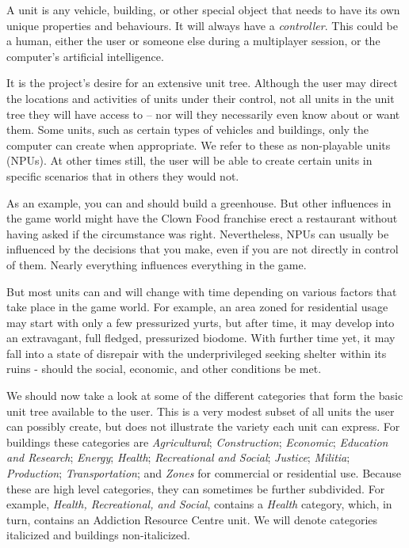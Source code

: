 

A unit is any vehicle, building, or other special object that needs to have its own unique properties and behaviours. It will always have a {\it controller}. This could be a human, either the user or someone else during a multiplayer session, or the computer's artificial intelligence.

It is the project's desire for an extensive unit tree. Although the user may direct the locations and activities of units under their control, not all units in the unit tree they will have access to -- nor will they necessarily even know about or want them. Some units, such as certain types of vehicles and buildings, only the computer can create when appropriate. We refer to these as non-playable units (NPUs). At other times still, the user will be able to create certain units in specific scenarios that in others they would not.

As an example, you can and should build a greenhouse. But other influences in the game world might have the Clown Food franchise erect a restaurant without having asked if the circumstance was right. Nevertheless, NPUs can usually be influenced by the decisions that you make, even if you are not directly in control of them. Nearly everything influences everything in the game.

But most units can and will change with time depending on various factors that take place in the game world. For example, an area zoned for residential usage may start with only a few pressurized yurts, but after time, it may develop into an extravagant, full fledged, pressurized biodome. With further time yet, it may fall into a state of disrepair with the underprivileged seeking shelter within its ruins - should the social, economic, and other conditions be met.

We should now take a look at some of the different categories that form the basic unit tree available to the user. This is a very modest subset of all units the user can possibly create, but does not illustrate the variety each unit can express. For buildings these categories are {\it Agricultural}; {\it Construction}; {\it Economic}; {\it Education and Research}; {\it Energy}; {\it Health}; {\it Recreational and Social}; {\it Justice}; {\it Militia}; {\it Production}; {\it Transportation}; and {\it Zones} for commercial or residential use. Because these are high level categories, they can sometimes be further subdivided. For example, {\it Health, Recreational, and Social}, contains a {\it Health} category, which, in turn, contains an Addiction Resource Centre unit. We will denote categories italicized and buildings non-italicized.

